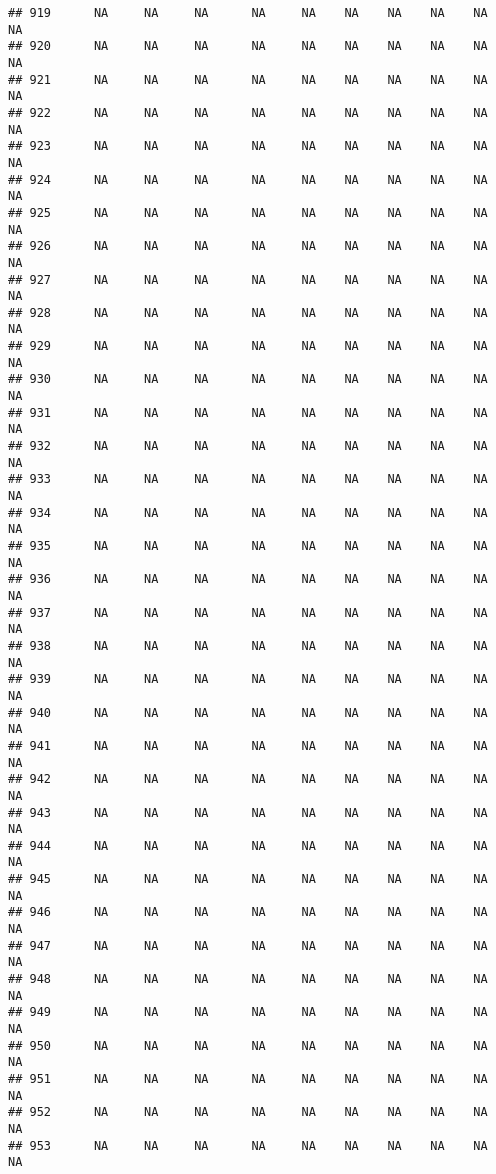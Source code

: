 \documentclass{article}\usepackage{graphicx, color}
\makeatletter
\newenvironment{kframe}{%
 \def\at@end@of@kframe{}%
 \ifinner\ifhmode%
  \def\at@end@of@kframe{\end{minipage}}%
  \begin{minipage}{\columnwidth}%
 \fi\fi%
 \def\FrameCommand##1{\hskip\@totalleftmargin \hskip-\fboxsep
 \colorbox{shadecolor}{##1}\hskip-\fboxsep
     \hskip-\linewidth \hskip-\@totalleftmargin \hskip\columnwidth}%
 \MakeFramed {\advance\hsize-\width
   \@totalleftmargin\z@ \linewidth\hsize
   \@setminipage}}%
 {\par\unskip\endMakeFramed%
 \at@end@of@kframe}
\newenvironment{knitrout}{}{} %
\makeatother
\begin{document}
\begin{knitrout}
\begin{kframe}
\begin{verbatim}
## 919      NA     NA     NA      NA     NA    NA    NA    NA    NA     NA
## 920      NA     NA     NA      NA     NA    NA    NA    NA    NA     NA
## 921      NA     NA     NA      NA     NA    NA    NA    NA    NA     NA
## 922      NA     NA     NA      NA     NA    NA    NA    NA    NA     NA
## 923      NA     NA     NA      NA     NA    NA    NA    NA    NA     NA
## 924      NA     NA     NA      NA     NA    NA    NA    NA    NA     NA
## 925      NA     NA     NA      NA     NA    NA    NA    NA    NA     NA
## 926      NA     NA     NA      NA     NA    NA    NA    NA    NA     NA
## 927      NA     NA     NA      NA     NA    NA    NA    NA    NA     NA
## 928      NA     NA     NA      NA     NA    NA    NA    NA    NA     NA
## 929      NA     NA     NA      NA     NA    NA    NA    NA    NA     NA
## 930      NA     NA     NA      NA     NA    NA    NA    NA    NA     NA
## 931      NA     NA     NA      NA     NA    NA    NA    NA    NA     NA
## 932      NA     NA     NA      NA     NA    NA    NA    NA    NA     NA
## 933      NA     NA     NA      NA     NA    NA    NA    NA    NA     NA
## 934      NA     NA     NA      NA     NA    NA    NA    NA    NA     NA
## 935      NA     NA     NA      NA     NA    NA    NA    NA    NA     NA
## 936      NA     NA     NA      NA     NA    NA    NA    NA    NA     NA
## 937      NA     NA     NA      NA     NA    NA    NA    NA    NA     NA
## 938      NA     NA     NA      NA     NA    NA    NA    NA    NA     NA
## 939      NA     NA     NA      NA     NA    NA    NA    NA    NA     NA
## 940      NA     NA     NA      NA     NA    NA    NA    NA    NA     NA
## 941      NA     NA     NA      NA     NA    NA    NA    NA    NA     NA
## 942      NA     NA     NA      NA     NA    NA    NA    NA    NA     NA
## 943      NA     NA     NA      NA     NA    NA    NA    NA    NA     NA
## 944      NA     NA     NA      NA     NA    NA    NA    NA    NA     NA
## 945      NA     NA     NA      NA     NA    NA    NA    NA    NA     NA
## 946      NA     NA     NA      NA     NA    NA    NA    NA    NA     NA
## 947      NA     NA     NA      NA     NA    NA    NA    NA    NA     NA
## 948      NA     NA     NA      NA     NA    NA    NA    NA    NA     NA
## 949      NA     NA     NA      NA     NA    NA    NA    NA    NA     NA
## 950      NA     NA     NA      NA     NA    NA    NA    NA    NA     NA
## 951      NA     NA     NA      NA     NA    NA    NA    NA    NA     NA
## 952      NA     NA     NA      NA     NA    NA    NA    NA    NA     NA
## 953      NA     NA     NA      NA     NA    NA    NA    NA    NA     NA

\end{verbatim}
\end{kframe}
\end{knitrout}
\end{document}
